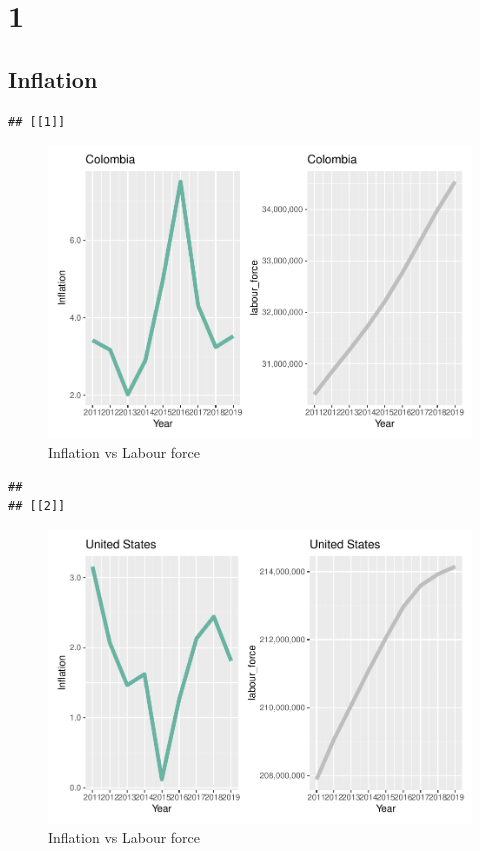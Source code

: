 \documentclass[
]{article}
\begin{document}
\section*{1}

\hypertarget{inflation}{%
\subsection{Inflation}\label{inflation}}

\begin{verbatim}
## [[1]]
\end{verbatim}

\begin{figure}
\centering
\includegraphics{The_Outsiders_5513_files/figure-latex/A1-1.pdf}
\caption{Inflation vs Labour force}
\end{figure}

\begin{verbatim}
## 
## [[2]]
\end{verbatim}

\begin{figure}
\centering
\includegraphics{The_Outsiders_5513_files/figure-latex/A1-2.pdf}
\caption{Inflation vs Labour force}
\end{figure}
\end{document}

